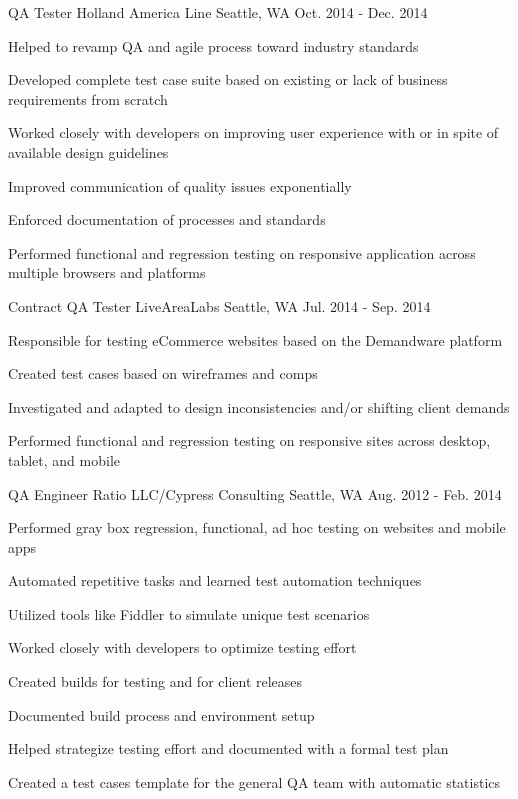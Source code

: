\begin{cventries}
\cventry
{QA Tester} %
{Holland America Line} %
{Seattle, WA} %
{Oct. 2014 - Dec. 2014} %
{
\begin{cvitems}
\item {Helped to revamp QA and agile process toward industry standards}
\item {Developed complete test case suite based on existing or lack of business requirements from scratch}
\item {Worked closely with developers on improving user experience with or in spite of available design guidelines}
\item {Improved communication of quality issues exponentially}
\item {Enforced documentation of processes and standards}
\item {Performed functional and regression testing on responsive application across multiple browsers and platforms}
\end{cvitems}
}

\cventry
{Contract QA Tester} %
{LiveAreaLabs} %
{Seattle, WA} %
{Jul. 2014 - Sep. 2014} %
{
\begin{cvitems}
\item {Responsible for testing eCommerce websites based on the Demandware platform}
\item {Created test cases based on wireframes and comps}
\item {Investigated and adapted to design inconsistencies and/or shifting client demands}
\item {Performed functional and regression testing on responsive sites across desktop, tablet, and mobile}
\end{cvitems}
}

\cventry
{QA Engineer} %
{Ratio LLC/Cypress Consulting} %
{Seattle, WA} %
{Aug. 2012 - Feb. 2014} %
{
\begin{cvitems}
\item {Performed gray box regression, functional, ad hoc testing on websites and mobile apps}
\item {Automated repetitive tasks and learned test automation techniques}
\item {Utilized tools like Fiddler to simulate unique test scenarios}
\item {Worked closely with developers to optimize testing effort}
\item {Created builds for testing and for client releases}
\item {Documented build process and environment setup}
\item {Helped strategize testing effort and documented with a formal test plan}
\item {Created a test cases template for the general QA team with automatic statistics}
\end{cvitems}
}


\end{cventries}
